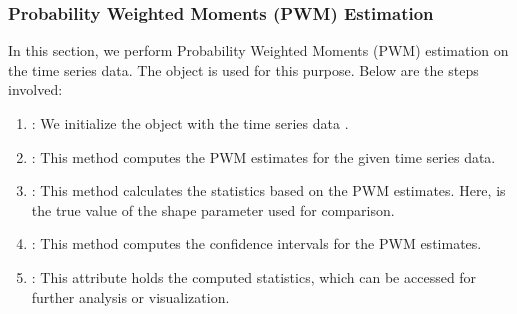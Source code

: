 \documentclass[a4paper,11pt,openany,english]{sphinxmanual}
\begin{document}
\subsubsection{Probability Weighted Moments (PWM) Estimation}
\label{\detokenize{notebooks/estimators:Probability-Weighted-Moments-(PWM)-Estimation}}
\sphinxAtStartPar
In this section, we perform Probability Weighted Moments (PWM) estimation on the time series data. The  object is used for this purpose. Below are the steps involved:
\begin{enumerate}
%
\item {} 
\sphinxAtStartPar
{}:  We initialize the  object with the time series data .

\item {} 
\sphinxAtStartPar
{}:  This method computes the PWM estimates for the given time series data.

\item {} 
\sphinxAtStartPar
{}:  This method calculates the statistics based on the PWM estimates. Here,  is the true value of the shape parameter used for comparison.

\item {} 
\sphinxAtStartPar
{}:  This method computes the confidence intervals for the PWM estimates.

\item {} 
\sphinxAtStartPar
{}:  This attribute holds the computed statistics, which can be accessed for further analysis or visualization.

\end{enumerate}
\end{document}
